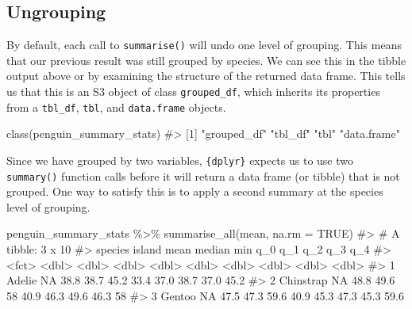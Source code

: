 \documentclass[
  letterpaper,
  DIV=11,
  numbers=noendperiod]{scrreprt}
\newenvironment{Shaded}{\begin{snugshade}}{\end{snugshade}}
\newcommand{\AttributeTok}[1]{\textcolor[rgb]{0.40,0.45,0.13}{#1}}
\newcommand{\CommentTok}[1]{\textcolor[rgb]{0.37,0.37,0.37}{#1}}
\newcommand{\ConstantTok}[1]{\textcolor[rgb]{0.56,0.35,0.01}{#1}}
\newcommand{\FunctionTok}[1]{\textcolor[rgb]{0.28,0.35,0.67}{#1}}
\newcommand{\NormalTok}[1]{\textcolor[rgb]{0.00,0.23,0.31}{#1}}
\newcommand{\SpecialCharTok}[1]{\textcolor[rgb]{0.37,0.37,0.37}{#1}}
\begin{document}
\subsection{Ungrouping}\label{ungrouping}

By default, each call to \texttt{summarise()} will undo one level of
grouping. This means that our previous result was still grouped by
species. We can see this in the tibble output above or by examining the
structure of the returned data frame. This tells us that this is an S3
object of class \texttt{grouped\_df}, which inherits its properties from
a \texttt{tbl\_df}, \texttt{tbl}, and \texttt{data.frame} objects.

\begin{Shaded}
\begin{Highlighting}[]
\FunctionTok{class}\NormalTok{(penguin\_summary\_stats)}
\CommentTok{\#\textgreater{} [1] "grouped\_df" "tbl\_df"     "tbl"        "data.frame"}
\end{Highlighting}
\end{Shaded}

Since we have grouped by two variables, \texttt{\{dplyr\}} expects us to
use two \texttt{summary()} function calls before it will return a data
frame (or tibble) that is not grouped. One way to satisfy this is to
apply a second summary at the species level of grouping.

\begin{Shaded}
\begin{Highlighting}[]
\NormalTok{penguin\_summary\_stats }\SpecialCharTok{\%\textgreater{}\%} 
  \FunctionTok{summarise\_all}\NormalTok{(mean, }\AttributeTok{na.rm =} \ConstantTok{TRUE}\NormalTok{)}
\CommentTok{\#\textgreater{} \# A tibble: 3 x 10}
\CommentTok{\#\textgreater{}   species   island  mean median   min   q\_0   q\_1   q\_2   q\_3   q\_4}
\CommentTok{\#\textgreater{}   \textless{}fct\textgreater{}      \textless{}dbl\textgreater{} \textless{}dbl\textgreater{}  \textless{}dbl\textgreater{} \textless{}dbl\textgreater{} \textless{}dbl\textgreater{} \textless{}dbl\textgreater{} \textless{}dbl\textgreater{} \textless{}dbl\textgreater{} \textless{}dbl\textgreater{}}
\CommentTok{\#\textgreater{} 1 Adelie        NA  38.8   38.7  45.2  33.4  37.0  38.7  37.0  45.2}
\CommentTok{\#\textgreater{} 2 Chinstrap     NA  48.8   49.6  58    40.9  46.3  49.6  46.3  58  }
\CommentTok{\#\textgreater{} 3 Gentoo        NA  47.5   47.3  59.6  40.9  45.3  47.3  45.3  59.6}
\end{Highlighting}
\end{Shaded}
\end{document}
